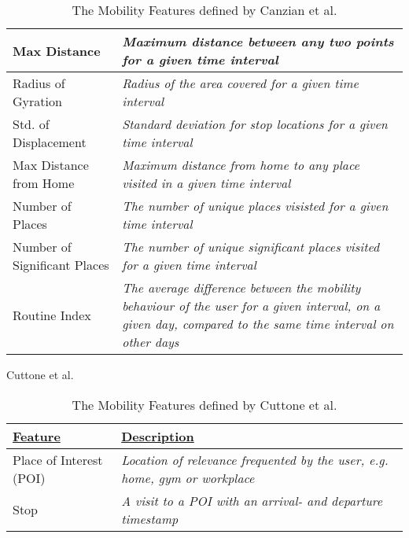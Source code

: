 \begin{table}[h]
\begin{tabular}{|p{}|p{}|}
Max Distance                 & \textit{Maximum distance between any two points for a given time interval}                                                                                        \\ \hline
Radius of Gyration           & \textit{Radius of the area covered for a given time interval}                                                                                                     \\ \hline
Std. of Displacement         & \textit{Standard deviation for stop locations for a given time interval}                                                                                          \\ \hline
Max Distance from Home       & \textit{Maximum distance from home to any place visited in a given time interval}                                                                                 \\ \hline
Number of Places             & \textit{The number of unique places visisted for a given time interval}                                                                                           \\ \hline
Number of Significant Places & \textit{The number of unique significant places visited for a given time interval}                                                                                \\ \hline
Routine Index                & \textit{The average difference between the mobility behaviour of the user for a given interval, on a given day, compared to the same time interval on other days} \\ \hline
\end{tabular}
    \caption{The Mobility Features defined by Canzian et al. \cite{Canzian2015}}
    \label{tab:canzian-features}
\end{table}

Cuttone et al. 
\begin{table}[]
    \centering
\begin{tabular}{|p{}|p{}|}
\hline
{\ul \textbf{Feature}}       & {\ul \textbf{Description}}                                                                                                                                        \\ \hline
Place of Interest (POI)                        & \textit{Location of relevance frequented by the user, e.g. home, gym or workplace}                                                                                                                    \\ \hline
Stop            & \textit{A visit to a POI with an arrival- and departure timestamp}                                                                                  \\ \hline
\end{tabular}
    \caption{The Mobility Features defined by Cuttone et al. \cite{sparse-location-2014}}
    \label{tab:my_label}
\end{table}
